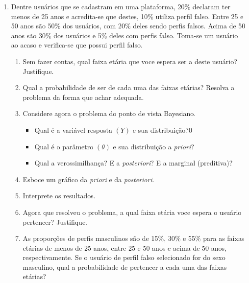 \documentclass[11pt,a4]{article}\usepackage[]{graphicx}\usepackage[]{xcolor}
\begin{document}
\begin{enumerate}
\begin{enumerate}
  \item Qual o valor esperado da distribuição a posteriori para $\theta$?
  \item Como poderia ser obtida a distribuição preditiva para uma nova observação após obter esta primeira amostra?
  \item Como obter o valor esperado da preditiva do item anterior?
  \item Foi necessário fazer uma segunda rodada de seleção na qual foram necessárias 15 entrevistas para se conseguir os 3 aprovados. Qual a posteriori após também considerar os dados desta segunda rodada de seleção? 
  \end{enumerate}

\item Dentre usuários que se cadastram em uma plataforma, 20\% declaram ter menos de 25 anos e acredita-se que destes, 10\% utiliza perfil falso. Entre 25 e 50 anos são 50\% dos usuários, com 20\% deles sendo perfis falsos. Acima de 50 anos são 30\% dos usuários e 5\% deles com perfis falso. Toma-se um usuário ao acaso e verifica-se que possui perfil falso.
\begin{enumerate}
\item Sem fazer contas, qual faixa etária que voce espera ser a deste usuário? Justifique.
\item Qual a probabilidade de ser de cada uma das faixas etárias? Resolva a problema da forma que achar adequada.
\item Considere agora o problema do ponto de vista Bayesiano.
\begin{itemize}
\item Qual é a variável resposta $(Y)$ e sua distribuição?0
\item Qual é o parâmetro $(\theta)$ e sua distribuição a {\it priori}?
\item Qual a verossimilhança? E a {\it posteriori}? E a marginal (preditiva)?
\end{itemize}
\item Esboce um gráfico da {\it priori} e da {\it posteriori}.
\item Interprete os resultados.
\item Agora que resolveu o problema, a qual faixa etária voce espera o usuário pertencer? Justifique.
\item As proporções de perfis masculinos são de 15\%, 30\% e 55\% para as faixas etárias de menos de 25 anos, entre 25 e 50 anos e acima de 50 anos, respectivamente. Se o usuário de perfil falso selecionado for do sexo masculino, qual a probabilidade de pertencer a cada uma das faixas etárias?
\end{enumerate}


\end{enumerate}
\end{document}
